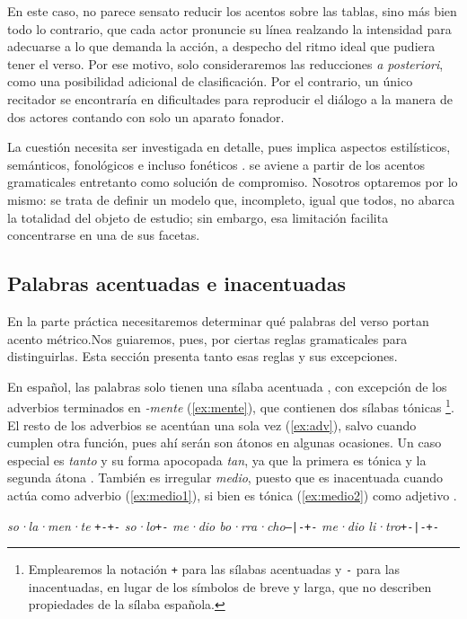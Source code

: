 En este caso, no parece sensato reducir los acentos sobre las tablas, sino más bien todo lo contrario, que cada actor pronuncie su línea realzando la intensidad para adecuarse a lo que demanda la acción, a despecho del ritmo ideal que pudiera tener el verso. Por ese motivo, solo consideraremos las reducciones \textit{a posteriori}, como una posibilidad adicional de clasificación. Por el contrario, un único recitador se encontraría en dificultades para reproducir el diálogo a la manera de dos actores contando con solo un aparato fonador.

La cuestión necesita ser investigada en detalle, pues implica aspectos estilísticos, semánticos, fonológicos e incluso fonéticos \parencite[57-58]{sanchez2017}. \citeauthor{sanchez2017} se aviene a partir de los acentos gramaticales entretanto como solución de compromiso. Nosotros optaremos por lo mismo: se trata de definir un modelo que, incompleto, igual que todos, no abarca la totalidad del objeto de estudio; sin embargo, esa limitación facilita concentrarse en una de sus facetas.

\subsection{Palabras acentuadas e inacentuadas}
En la parte práctica necesitaremos determinar qué palabras del verso portan acento métrico.Nos guiaremos, pues, por ciertas reglas gramaticales para distinguirlas. Esta sección presenta tanto esas reglas y sus excepciones.

En español, las palabras solo tienen una sílaba acentuada \parencite[22]{quilis2013}, con excepción de los adverbios terminados en \textit{-mente} (\ref{ex:mente}), que contienen dos sílabas tónicas \parencite[26]{quilis2013}\footnote{Emplearemos la notación \texttt{+} para las sílabas acentuadas y \texttt{-} para las inacentuadas, en lugar de los símbolos de breve y larga, que no describen propiedades de la sílaba española.}. El resto de los adverbios se acentúan una sola vez (\ref{ex:adv}), salvo cuando cumplen otra función, pues ahí serán son átonos en algunas ocasiones. Un caso especial es \textit{tanto} y su forma apocopada \textit{tan}, ya que la primera es tónica y la segunda átona \autocite[169a]{navarrotomas2004}. También es irregular \textit{medio}, puesto que es inacentuada cuando actúa como adverbio (\ref{ex:medio1}), si bien es tónica (\ref{ex:medio2}) como adjetivo \autocite[169c]{navarrotomas2004}.
\begin{exe}
	\ex\label{ex:mente} \textit{so·la·men·te} \tab \texttt{+-+-}
		\ex\label{ex:adv} \textit{so·lo}\tab \texttt{+-}
		\ex\label{ex:medio1} \textit{me·dio bo·rra·cho}\tab \texttt{--|-+-}
		\ex\label{ex:medio2} \textit{me·dio li·tro}\tab \texttt{+-|-+-}
\end{exe}

